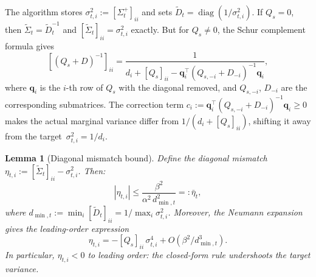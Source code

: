 \documentclass{article}
\theoremstyle{plain}
\newtheorem{lemma}[theorem]{Lemma}
\theoremstyle{definition}
\theoremstyle{remark}
\DeclareMathOperator{\diag}{diag}
\begin{document}
The algorithm stores $\sigma_{t,i}^2 := [\Sigma_t^+]_{ii}$ and sets $\widetilde{D}_t = \diag(1/\sigma_{t,i}^2)$. If $Q_s = 0$, then $\widetilde{\Sigma}_t = \widetilde{D}_t^{-1}$ and $[\widetilde{\Sigma}_t]_{ii} = \sigma_{t,i}^2$ exactly. But for $Q_s \neq 0$, the Schur complement formula gives
\begin{equation}\label{eq:schur}
[(Q_s + D)^{-1}]_{ii} = \frac{1}{d_i + [Q_s]_{ii} - \mathbf{q}_i^\top(Q_{s,-i} + D_{-i})^{-1}\mathbf{q}_i},
\end{equation}
where $\mathbf{q}_i$ is the $i$-th row of $Q_s$ with the diagonal removed, and $Q_{s,-i}$, $D_{-i}$ are the corresponding submatrices. The correction term $c_i := \mathbf{q}_i^\top(Q_{s,-i} + D_{-i})^{-1}\mathbf{q}_i \geq 0$ makes the actual marginal variance differ from $1/(d_i + [Q_s]_{ii})$, shifting it away from the target~$\sigma_{t,i}^2 = 1/d_i$.

\begin{lemma}[Diagonal mismatch bound]
\label{lem:diag_mismatch}
Define the diagonal mismatch $\eta_{t,i} := [\widetilde{\Sigma}_t]_{ii} - \sigma_{t,i}^2$. Then:
\begin{equation}\label{eq:eta_bound}
|\eta_{t,i}| \leq \frac{\beta^2}{\alpha^2\, d_{\min,t}^2} =: \bar{\eta}_t,
\end{equation}
where $d_{\min,t} := \min_i [\widetilde{D}_t]_{ii} = 1/\max_i \sigma_{t,i}^2$. Moreover, the Neumann expansion gives the leading-order expression
\begin{equation}\label{eq:eta_leading}
\eta_{t,i} = -[Q_s]_{ii}\,\sigma_{t,i}^4 + O(\beta^2/d_{\min,t}^3).
\end{equation}
In particular, $\eta_{t,i} < 0$ to leading order: the closed-form rule undershoots the target variance.
\end{lemma}
\end{document}
